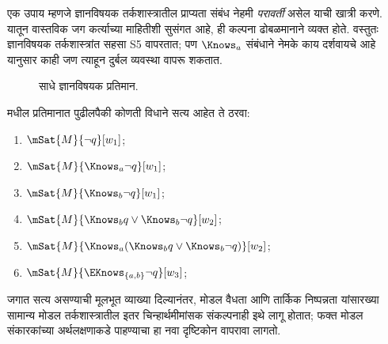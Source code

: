 \documentclass[../../../include/open-logic-section]{subfiles}
\begin{document}
एक उपाय म्हणजे ज्ञानविषयक तर्कशास्त्रातील प्राप्यता
संबंध नेहमी \emph{परावर्ती} असेल याची खात्री करणे.
यातून वास्तविक जग कर्त्याच्या माहितीशी सुसंगत आहे,
ही कल्पना ढोबळमानाने व्यक्त होते. वस्तुतः ज्ञानविषयक
तर्कशास्त्रांत सहसा S5 वापरतात; पण $\Knows_a$ संबंधाने
नेमके काय दर्शवायचे आहे यानुसार काही जण त्याहून
दुर्बल व्यवस्था वापरू शकतात.

\begin{figure}
  \begin{center}
  \end{center}
  \caption{साधे ज्ञानविषयक प्रतिमान.}
\end{figure}

\begin{prob}
   मधील प्रतिमानात
  पुढीलपैकी कोणती विधाने सत्य आहेत ते ठरवा:
  \begin{enumerate}
    \item $\mSat{M}{\lnot q}[w_1]$;
    \item $\mSat{M}{\Knows_a \lnot q}[w_1]$;
    \item $\mSat{M}{\Knows_b \lnot q}[w_1]$;
    \item $\mSat{M}{\Knows_b q \lor \Knows_b \lnot q}[w_2]$;
    \item $\mSat{M}{\Knows_a( \Knows_b q \lor \Knows_b \lnot q)}[w_2]$;
    \item $\mSat{M}{\EKnows_{\{a,b\}} \lnot q}[w_3]$;
    \end{enumerate}
\end{prob}

जगात सत्य असण्याची मूलभूत व्याख्या दिल्यानंतर,
मोडल वैधता आणि तार्किक निष्पन्नता यांसारख्या सामान्य
मोडल तर्कशास्त्रातील इतर चिन्हार्थमीमांसक संकल्पनाही
इथे लागू होतात; फक्त मोडल संकारकांच्या अर्थलक्षणाकडे
पाहण्याचा हा नवा दृष्टिकोन वापरावा लागतो.
\end{document}
